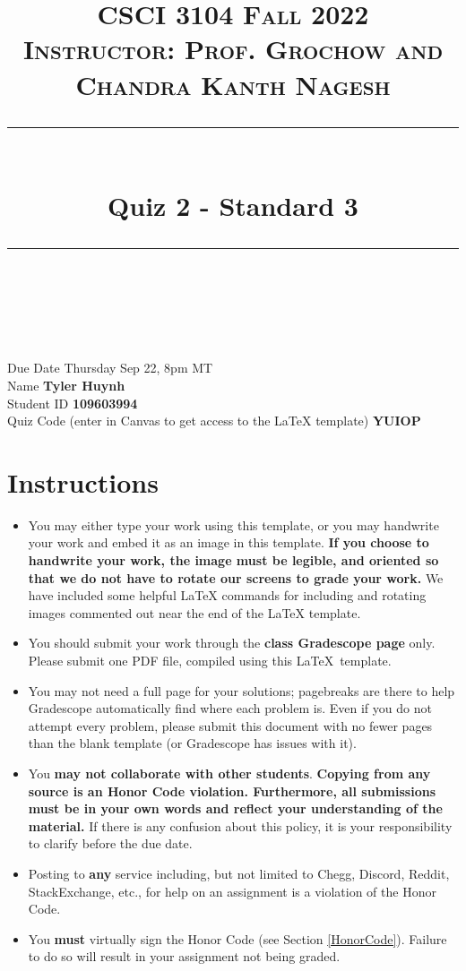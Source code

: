 \documentclass[11pt]{article}
\title{
\normalfont \normalsize 
\textsc{CSCI 3104 Fall 2022 \\ 
Instructor: Prof. Grochow and Chandra Kanth Nagesh} \\
[10pt] 
\rule{\linewidth}{0.5pt} \\[6pt] 
\huge Quiz 2 - Standard 3 \\
\rule{\linewidth}{2pt}  \\[10pt]
}
\date{}
\theoremstyle{definition}
\theoremstyle{definition}
\theoremstyle{definition}
\begin{document}
\maketitle


\noindent
Due Date \dotfill Thursday Sep 22, 8pm MT \\
Name \dotfill \textbf{Tyler Huynh} \\
Student ID \dotfill \textbf{109603994} \\
Quiz Code (enter in Canvas to get access to the LaTeX template) \dotfill \textbf{YUIOP}


\tableofcontents

\section*{Instructions}
 \begin{itemize}
	\item You may either type your work using this template, or you may handwrite your work and embed it as an image in this template. \textbf{If you choose to handwrite your work, the image must be legible, and oriented so that we do not have to rotate our screens to grade your work.} We have included some helpful LaTeX commands for including and rotating images commented out near the end of the LaTeX template.
	\item You should submit your work through the \textbf{class Gradescope page} only. Please submit one PDF file, compiled using this \LaTeX \ template.
	\item You may not need a full page for your solutions; pagebreaks are there to help Gradescope automatically find where each problem is. Even if you do not attempt every problem, please submit this document with no fewer pages than the blank template (or Gradescope has issues with it).

	\item You \textbf{may not collaborate with other students}. \textbf{Copying from any source is an Honor Code violation. Furthermore, all submissions must be in your own words and reflect your understanding of the material.} If there is any confusion about this policy, it is your responsibility to clarify before the due date. 

	\item Posting to \textbf{any} service including, but not limited to Chegg, Discord, Reddit, StackExchange, etc., for help on an assignment is a violation of the Honor Code.

	\item You \textbf{must} virtually sign the Honor Code (see Section \ref{HonorCode}). Failure to do so will result in your assignment not being graded.
\end{itemize}
\end{document}
